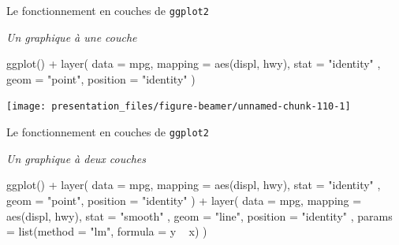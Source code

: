 \documentclass[12pt,handout,ignorenonframetext,]{beamer}
\newenvironment{Shaded}{}{}
\newcommand{\KeywordTok}[1]{\textcolor[rgb]{0.00,0.00,1.00}{#1}}
\newcommand{\DataTypeTok}[1]{#1}
\newcommand{\StringTok}[1]{\textcolor[rgb]{0.00,0.50,0.50}{#1}}
\newcommand{\OperatorTok}[1]{#1}
\newcommand{\NormalTok}[1]{#1}
\renewenvironment{Shaded}{\begin{snugshade}}{\end{snugshade}}
\begin{document}
\begin{frame}[fragile]{\large Le fonctionnement en \og couches \fg{} de
\texttt{ggplot2}}

\emph{Un graphique à une couche}

\footnotesize \centering

\begin{Shaded}
\begin{Highlighting}[]
\KeywordTok{ggplot}\NormalTok{() }\OperatorTok{+}\StringTok{ }\KeywordTok{layer}\NormalTok{(}
  \DataTypeTok{data =}\NormalTok{ mpg, }\DataTypeTok{mapping =} \KeywordTok{aes}\NormalTok{(displ, hwy), }\DataTypeTok{stat =} \StringTok{"identity"}
\NormalTok{  , }\DataTypeTok{geom =} \StringTok{"point"}\NormalTok{, }\DataTypeTok{position =} \StringTok{"identity"}
\NormalTok{)}
\end{Highlighting}
\end{Shaded}

\texttt{[image: presentation\_files/figure-beamer/unnamed-chunk-110-1]}

\end{frame}

\begin{frame}[fragile]{\large Le fonctionnement en \og couches \fg{} de
\texttt{ggplot2}}

\emph{Un graphique à deux couches}

\footnotesize \centering

\begin{Shaded}
\begin{Highlighting}[]
\KeywordTok{ggplot}\NormalTok{() }\OperatorTok{+}\StringTok{ }\KeywordTok{layer}\NormalTok{(}
  \DataTypeTok{data =}\NormalTok{ mpg, }\DataTypeTok{mapping =} \KeywordTok{aes}\NormalTok{(displ, hwy), }\DataTypeTok{stat =} \StringTok{"identity"}
\NormalTok{  , }\DataTypeTok{geom =} \StringTok{"point"}\NormalTok{, }\DataTypeTok{position =} \StringTok{"identity"}
\NormalTok{) }\OperatorTok{+}\StringTok{ }\KeywordTok{layer}\NormalTok{(}
  \DataTypeTok{data =}\NormalTok{ mpg, }\DataTypeTok{mapping =} \KeywordTok{aes}\NormalTok{(displ, hwy), }\DataTypeTok{stat =} \StringTok{"smooth"}
\NormalTok{  , }\DataTypeTok{geom =} \StringTok{"line"}\NormalTok{, }\DataTypeTok{position =} \StringTok{"identity"}
\NormalTok{  , }\DataTypeTok{params =} \KeywordTok{list}\NormalTok{(}\DataTypeTok{method =} \StringTok{"lm"}\NormalTok{, }\DataTypeTok{formula =}\NormalTok{ y }\OperatorTok{~}\StringTok{ }\NormalTok{x)}
\NormalTok{)}
\end{Highlighting}
\end{Shaded}

\vfill

\vfill

\end{frame}
\end{document}
